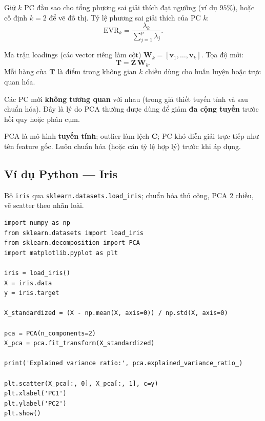 \begin{phuongphap}[title={Bước 4: Chọn số thành phần}]
Giữ $k$ PC đầu sao cho tổng phương sai giải thích đạt ngưỡng (ví dụ $95\%$), hoặc cố định $k=2$ để vẽ đồ thị. Tỷ lệ phương sai giải thích của PC $k$:
\[
\text{EVR}_k = \frac{\lambda_k}{\sum_{j=1}^{p}\lambda_j}.
\]
\end{phuongphap}

\begin{phuongphap}[title={Bước 5: Chiếu dữ liệu}]
Ma trận loadings (các vector riêng làm cột) $\mathbf{W}_k = [\mathbf{v}_1,\ldots,\mathbf{v}_k]$. Tọa độ mới:
\[
\mathbf{T} = \mathbf{Z}\,\mathbf{W}_k.
\]
Mỗi hàng của $\mathbf{T}$ là điểm trong không gian $k$ chiều dùng cho huấn luyện hoặc trực quan hóa.
\end{phuongphap}

\begin{dinhnghia}[title={Hệ trực giao và giảm tương quan}]
Các PC mới \textbf{không tương quan} với nhau (trong giả thiết tuyến tính và sau chuẩn hóa). Đây là lý do PCA thường được dùng để giảm \textbf{đa cộng tuyến} trước hồi quy hoặc phân cụm.
\end{dinhnghia}

\begin{luuy}[title={Giả định và hạn chế lý thuyết}]
PCA là mô hình \textbf{tuyến tính}; outlier làm lệch $\mathbf{C}$; PC khó diễn giải trực tiếp như tên feature gốc. Luôn chuẩn hóa (hoặc căn tỷ lệ hợp lý) trước khi áp dụng.
\end{luuy}

\subsection{Ví dụ Python --- Iris}

\begin{dongco}[title={Dữ liệu}]
Bộ \texttt{iris} qua \texttt{sklearn.datasets.load\_iris}; chuẩn hóa thủ công, PCA 2 chiều, vẽ scatter theo nhãn loài.
\end{dongco}

\begin{vidu}[title={Mã đầy đủ}]
\begin{lstlisting}
import numpy as np
from sklearn.datasets import load_iris
from sklearn.decomposition import PCA
import matplotlib.pyplot as plt

iris = load_iris()
X = iris.data
y = iris.target

X_standardized = (X - np.mean(X, axis=0)) / np.std(X, axis=0)

pca = PCA(n_components=2)
X_pca = pca.fit_transform(X_standardized)

print('Explained variance ratio:', pca.explained_variance_ratio_)

plt.scatter(X_pca[:, 0], X_pca[:, 1], c=y)
plt.xlabel('PC1')
plt.ylabel('PC2')
plt.show()
\end{lstlisting}
\end{vidu}

